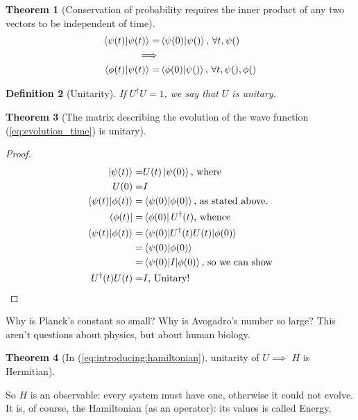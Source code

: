 \documentclass[]{article}
\newtheorem{thm}{Theorem}
\newtheorem{defn}[thm]{Definition}
\begin{document}
\begin{thm}[Conservation of probability requires the inner product of any two vectors to be independent of time]
	\begin{align*}
		\braket{\psi(t)\vert \psi(t)} =& \braket{\psi(0)\vert \psi()} \text{, $\forall t, \psi()$}\\
		\implies&\\
		\braket{\phi(t)\vert \psi(t)} =& \braket{\phi(0)\vert \psi()} \text{, $\forall t, \psi(), \phi()$}
	\end{align*}
\end{thm}

\begin{defn}[Unitarity]
	If $U^\dagger U=1$, we say that $U$ is unitary.
\end{defn}

\begin{thm}[The matrix describing the evolution of the wave function (\ref{eq:evolution_time}) is unitary]
\end{thm}
\begin{proof}
	\begin{align*}
		\ket{\psi(t)} =& U(t) \ket{\psi(0)} \text{, where} \\
		U(0) =& I\\
		\braket{\psi(t)\vert\phi(t)} =& \braket{\psi(0)\vert\phi(0)} \text{, as stated above.}\\
		\bra{\phi(t)} =& \bra{\phi(0)} U^\dagger(t) \text{, whence}\\
		\braket{\psi(t)\vert\phi(t)} =& \braket{\psi(0)\vert U^\dagger(t) U(t)\vert\phi(0)}\\
		=& \braket{\psi(0)\vert\phi(0)} \\
		=& \braket{\psi(0)\vert I \vert \phi(0)} \text{, so we can show}\\
		U^\dagger(t) U(t)=& I \text {, Unitary!}
	\end{align*}
\end{proof}

Why is Planck's constant so small? Why is Avogadro's number so large? This aren't questions about physics, but about human biology.

\begin{thm}[In (\ref{eq:introducing:hamiltonian}),  unitarity of $U\implies$ $H$ is Hermitian]
\end{thm}

So $H$ is an observable: every system must have one, otherwise it could not evolve. It is, of course, the Hamiltonian (as an operator): its values is called Energy.
\end{document}
